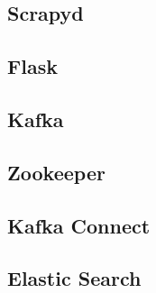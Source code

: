 \subsection{Scrapyd}
\subsection{Flask}
\subsection{Kafka}
\subsection{Zookeeper}
\subsection{Kafka Connect}
\subsection{Elastic Search}
